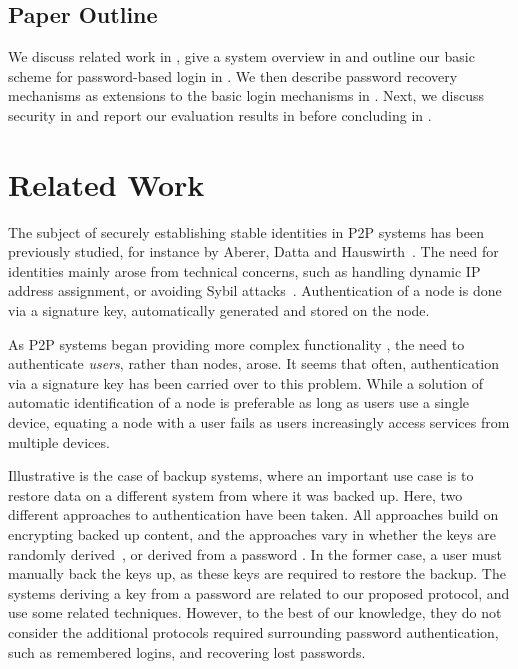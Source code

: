 \subsection{Paper Outline}
We discuss related work in , give a system
overview in  and outline our basic scheme for
password-based login in . We then describe
password recovery mechanisms as extensions to the basic login
mechanisms in . Next, we discuss security in
 and report our evaluation results in
 before concluding in .

\section{Related Work} 

The subject of securely establishing stable identities in P2P systems has been
previously studied, for instance by Aberer, Datta and
Hauswirth~\cite{AbererDH04}. The need for identities mainly arose from
technical concerns, such as handling dynamic IP address assignment, or
avoiding Sybil attacks~\cite{Douceur02}. Authentication of a node is done via
a signature key, automatically generated and stored on the node.

As P2P systems began providing more complex functionality
\cite{IsdalPKA10,Cutillo09a,AbbasPES09,LillibridgeEBBI03}, the need to authenticate
\emph{users}, rather than nodes, arose. It seems that often, authentication
via a signature key has been carried over to this problem. While a solution
of automatic identification of a node is preferable as long as users use a
single device, equating a node with a user fails as users increasingly access
services from multiple devices.

Illustrative is the case of backup systems, where an important use case is to
restore data on a different system from where it was backed up. Here, two
different approaches to authentication have been taken. All approaches build
on encrypting backed up content, and the approaches vary in whether the keys
are randomly derived~\cite{LillibridgeEBBI03}, or derived from a password
\cite{CoxMN02}. In the former case, a user must manually
back the keys up, as these keys are required to restore the backup. The
systems deriving a key from a password are related to our proposed protocol,
and use some related techniques. However, to the best of our knowledge, they
do not consider the additional protocols required surrounding password
authentication, such as remembered logins, and recovering lost passwords.

